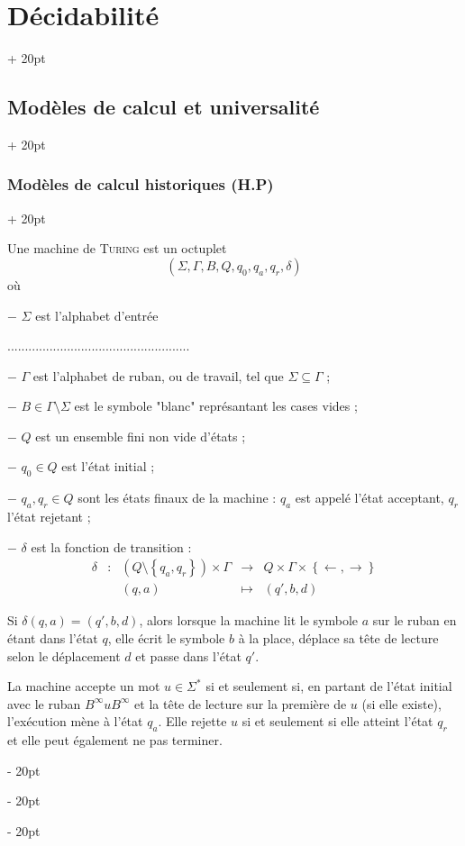 \documentclass[a4paper, 12pt, twoside]{article}
\newcommand{\lr}[1]{\left( #1 \right)}
\newcommand{\set}[1]{\left\{ #1 \right\}}
\newcommand{\ind}[1][20pt]{\advance\leftskip + #1}
\newcommand{\deind}[1][20pt]{\advance\leftskip - #1}
\newenvironment{indt}[2][20pt]{#2 \par \ind[#1]}{\par \deind} %
\begin{document}
\begin{indt}{\section{Décidabilité}}
\begin{indt}{\subsection{Modèles de calcul et universalité}}
\begin{indt}{\subsubsection{Modèles de calcul historiques (H.P)}}
                \begin{emphBox}
                    Une machine de \textsc{Turing} est un octuplet
                    \[
                        \lr{\Sigma, \Gamma, B, Q, q_0, q_a, q_r, \delta}
                    \]
                    où

                    $-$ $\Sigma$ est l'alphabet d'entrée 

                    ....................................................

                    $-$ $\Gamma$ est l'alphabet de ruban, ou de travail, tel que $\Sigma \subseteq \Gamma$ ;

                    $-$ $B \in \Gamma \setminus \Sigma$ est le symbole "blanc" représantant les cases vides ;

                    $-$ $Q$ est un ensemble fini non vide d'états ;

                    $-$ $q_0 \in Q$ est l'état initial ;

                    $-$ $q_a, q_r \in Q$ sont les états finaux de la machine : $q_a$ est appelé l'état acceptant, $q_r$ l'état rejetant ;

                    $-$ $\delta$ est la fonction de transition :
                    \[
                        \begin{array}{ccccc}
                            \delta
                            & : & \lr{Q \setminus \set{q_a, q_r}} \times \Gamma
                            & \longrightarrow & Q \times \Gamma \times \set{\leftarrow, \rightarrow}
                            \\
                            && (q, a)
                            & \longmapsto
                            & (q', b, d)
                        \end{array}
                    \]
                \end{emphBox}

                Si $\delta(q, a) = (q', b, d)$, alors lorsque la machine lit le symbole $a$ sur le ruban en étant dans l'état $q$, elle écrit le symbole $b$ à la place, déplace sa tête de lecture selon le déplacement $d$ et passe dans l'état $q'$.

                La machine accepte un mot $u \in \Sigma^*$ si et seulement si, en partant de l'état initial avec le ruban $B^\infty u B^\infty$ et la tête de lecture sur la première de $u$ (si elle existe), l'exécution mène à l'état $q_a$. Elle rejette $u$ si et seulement si elle atteint l'état $q_r$ et elle peut également ne pas terminer.


\end{indt}
\end{indt}
\end{indt}
\end{document}
